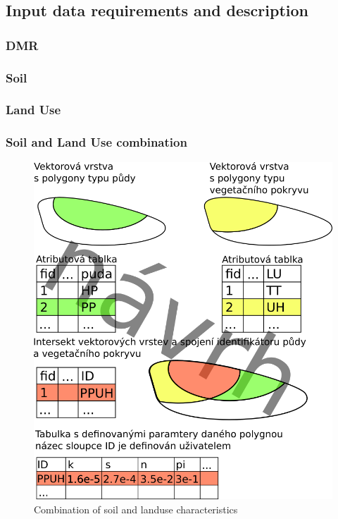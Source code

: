     


    \FloatBarrier
    \subsection{Input data requirements and description}

        
        \subsubsection{DMR}
        \subsubsection{Soil}
        \subsubsection{Land Use}
        \subsubsection{Soil and Land Use  combination}
            \begin{figure}[!b]
                \centering
                \includegraphics[width=0.5\linewidth]{./img-prep/spojenistabulkou.png}
                \caption{Combination of soil and landuse characteristics}
                \label{fig:soilvegcreate}
            \end{figure}
        





